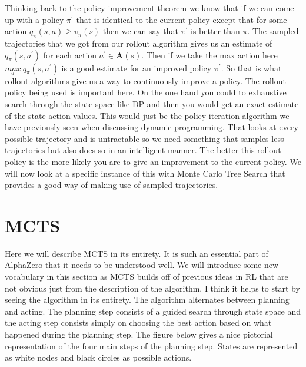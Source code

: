Thinking back to the policy improvement theorem we know that if we can come up with a policy $\pi^{'}$ that is identical to the current policy except that for some action $q_{\pi}(s,a) \geq v_{\pi}(s)$ then we can say that $\pi^{'}$ is better than $\pi$. The sampled trajectories that we got from our rollout algorithm gives us an estimate of $q_{\pi}(s,a^{'})$ for each action $a^{'} \in \mathbf{A}(s)$. Then if we take the max action here $\underset{a}{max} \: q_{\pi}(s,a^{'})$ is a good estimate for an improved policy $\pi^{'}$. So that is what rollout algorithms give us a way to continuously improve a policy. The rollout policy being used is important here. On the one hand you could to exhaustive search through the state space like DP and then you would get an exact estimate of the state-action values. This would just be the policy iteration algorithm we have previously seen when discussing dynamic programming. That looks at every possible trajectory and is untractable so we need something that samples less trajectories but also does so in an intelligent manner. The better this rollout policy is the more likely you are to give an improvement to the current policy. We will now look at a specific instance of this with Monte Carlo Tree Search that provides a good way of making use of sampled trajectories. 

\section{MCTS}

Here we will describe MCTS in its entirety. It is such an essential part of AlphaZero that it needs to be understood well. We will introduce some new vocabulary in this section as MCTS builds off of previous ideas in RL that are not obvious just from the description of the algorithm. I think it helps to start by seeing the algorithm in its entirety. The algorithm alternates between planning and acting. The planning step consists of a guided search through state space and the acting step consists simply on choosing the best action based on what happened during the planning step. The figure below gives a nice pictorial representation of the four main steps of the planning step. States are represented as white nodes and black circles as possible actions.    


